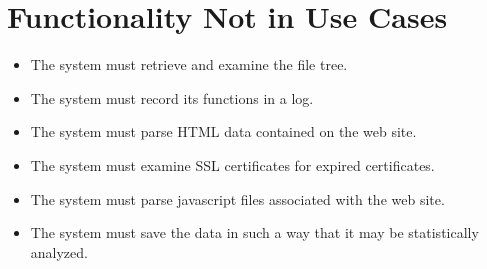 \section{Functionality Not in Use Cases}
\begin{itemize} 
    \item The system must retrieve and examine the file tree.
    \item The system must record its functions in a log.
    \item The system must parse HTML data contained on the web site.
    \item The system must examine SSL certificates for expired certificates.
    \item The system must parse javascript files associated with the web site.
    \item The system must save the data in such a way that it may be statistically analyzed.
\end{itemize}
